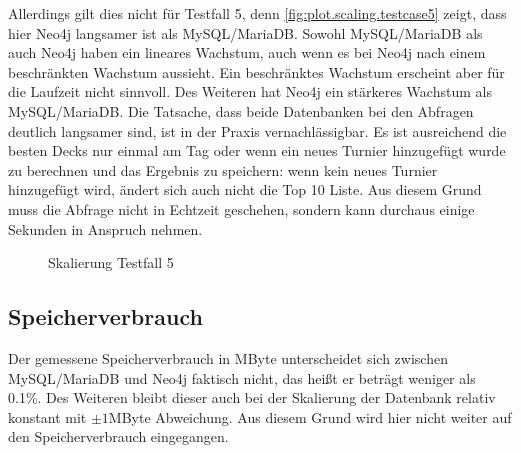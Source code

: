 Allerdings gilt dies nicht für Testfall 5, denn \autoref{fig:plot.scaling.testcase5} zeigt, dass hier Neo4j langsamer ist als MySQL/MariaDB. Sowohl MySQL/MariaDB als auch Neo4j haben ein lineares Wachstum, auch wenn es bei Neo4j nach einem beschränkten Wachstum aussieht. Ein beschränktes Wachstum erscheint aber für die Laufzeit nicht sinnvoll. Des Weiteren hat Neo4j ein stärkeres Wachstum als MySQL/MariaDB. Die Tatsache, dass beide Datenbanken bei den Abfragen deutlich langsamer sind, ist in der Praxis vernachlässigbar. Es ist ausreichend die besten Decks nur einmal am Tag oder wenn ein neues Turnier hinzugefügt wurde zu berechnen und das Ergebnis zu speichern: wenn kein neues Turnier hinzugefügt wird, ändert sich auch nicht die Top 10 Liste. Aus diesem Grund muss die Abfrage nicht in Echtzeit geschehen, sondern kann durchaus einige Sekunden in Anspruch nehmen.


\begin{figure}[t]
    \myfloatalign
    \caption{Skalierung Testfall 5}
    \label{fig:plot.scaling.testcase5}
\end{figure}


\subsection{Speicherverbrauch}
Der gemessene Speicherverbrauch in MByte unterscheidet sich zwischen MySQL/MariaDB und Neo4j faktisch nicht, das heißt er beträgt weniger als 0.1\%. Des Weiteren bleibt dieser auch bei der Skalierung der Datenbank relativ konstant mit $\pm1$MByte Abweichung. Aus diesem Grund wird hier nicht weiter auf den Speicherverbrauch eingegangen.